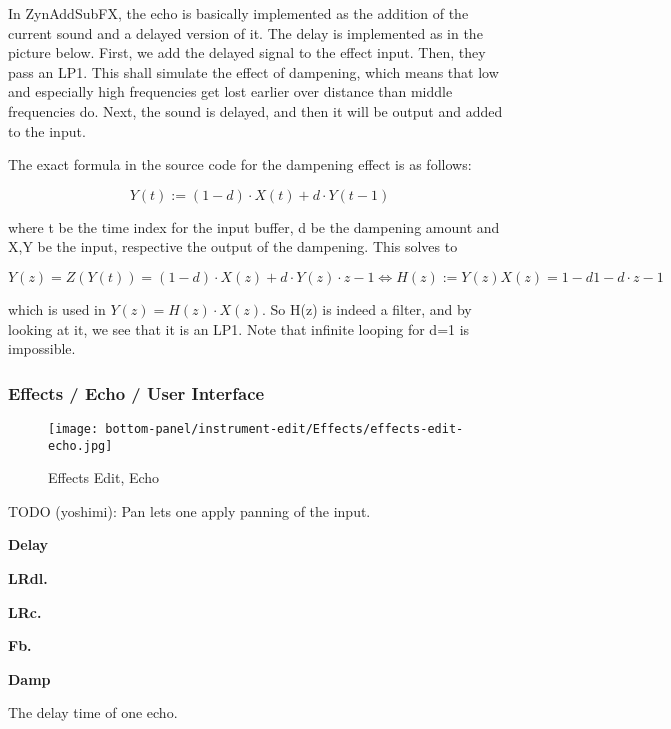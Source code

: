    In ZynAddSubFX, the echo is basically implemented as the addition of the
   current sound and a delayed version of it. The delay is implemented as in
   the picture below. First, we add the delayed signal to the effect input.
   Then, they pass an LP1. This shall simulate the effect of dampening, which
   means that low and especially high frequencies get lost earlier over
   distance than middle frequencies do. Next, the sound is delayed, and then
   it will be output and added to the input.

   The exact formula in the source code for the dampening effect is as
   follows:

   \[Y(t):=(1-d)⋅X(t)+d⋅Y(t-1)\]

   where t be the time index for the input buffer, d be the dampening amount
   and X,Y be the input, respective the output of the dampening. This solves
   to

   \[Y(z)=Z(Y(t))=(1-d)⋅X(z)+d⋅Y(z)⋅z-1 ⇔ H(z):=Y(z)X(z)=1-d1-d⋅z-1\]

   which is used in \(Y(z)=H(z)⋅X(z)\). So H(z) is indeed a filter, and by
   looking at it, we see that it is an LP1. Note that infinite looping for
   d=1 is impossible.

\subsubsection{Effects / Echo / User Interface}
\label{subsubsec:effects_edit_echo_ui}

\begin{figure}[H]
   \centering 
   \texttt{[image: bottom-panel/instrument-edit/Effects/effects-edit-echo.jpg]}
   \caption{Effects Edit, Echo}
   \label{fig:effects_edit_echo}
\end{figure}

   TODO (yoshimi):  Pan lets one apply panning of the input.

   \begin{enumber}
      \item \textbf{Delay}
      \item \textbf{LRdl.}
      \item \textbf{LRc.}
      \item \textbf{Fb.}
      \item \textbf{Damp}
   \end{enumber}

   \setcounter{ItemCounter}{0}      %
 
   The delay time of one echo.

